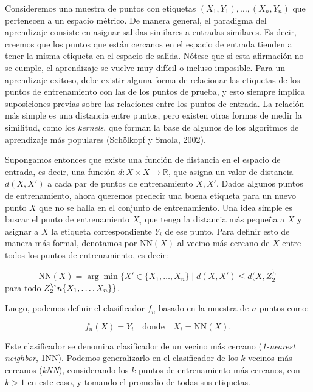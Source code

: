 \documentclass{report}
\begin{document}
Consideremos una muestra de puntos con etiquetas \((X_1, Y_1), \dots, (X_n, Y_n)\) que 
pertenecen a un espacio métrico. De manera general, el paradigma del aprendizaje consiste en asignar salidas 
similares a entradas similares. Es decir, creemos que los puntos que están cercanos en el espacio 
de entrada tienden a tener la misma etiqueta en el espacio de salida. Nótese que si esta afirmación 
no se cumple, el aprendizaje se vuelve muy difícil o incluso imposible. Para un aprendizaje exitoso, 
debe existir alguna forma de relacionar las etiquetas de los puntos de entrenamiento con las de los 
puntos de prueba, y esto siempre implica suposiciones previas sobre las relaciones entre los puntos 
de entrada. La relación más simple es una distancia entre puntos, pero existen otras formas de medir 
la similitud, como los \textit{kernels}, que forman la base de algunos de los algoritmos 
de aprendizaje más populares (Schölkopf y Smola, 2002).\newline

Supongamos entonces que existe una función de distancia en el espacio de entrada, es decir, una función 
\(d : X \times X \to \mathbb{R}\), que asigna un valor de distancia \(d(X, X')\) a cada par de puntos 
de entrenamiento \(X, X'\). Dados algunos puntos de entrenamiento, ahora queremos predecir una buena 
etiqueta para un nuevo punto \(X\) que no se halla en el conjunto de entrenamiento.
 Una idea simple es buscar el punto de entrenamiento \(X_i\) 
que tenga la distancia más pequeña a \(X\) y asignar a \(X\) la etiqueta correspondiente \(Y_i\) de 
ese punto. Para definir esto de manera más formal, denotamos por \(\text{NN}(X)\) al vecino más cercano 
de \(X\) entre todos los puntos de entrenamiento, es decir:

\[
\text{NN}(X) = \arg\min \{X' \in \{X_1, \dots, X_n\} \mid d(X, X') \leq d(X, Z_2^{), }
\]
para todo \( Z_2^{ \i}n \{X_1, \dots, X_n\}\}\). \newline

Luego, podemos definir el clasificador \(f_n\) basado en la muestra de \(n\) puntos como:

\[
f_n(X) = Y_i \quad \text{donde} \quad X_i = \text{NN}(X).
\]

Este clasificador se denomina clasificador de un vecino más cercano (\textit{1-nearest neighbor}, 1NN). 
Podemos generalizarlo en el clasificador de los \(k\)-vecinos más cercanos (\textit{kNN}), considerando los \(k\) puntos de 
entrenamiento más cercanos, con $k>1$ en este caso, y tomando el promedio de todas sus etiquetas. \newline
\end{document}
